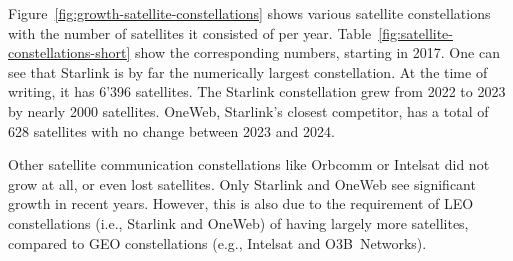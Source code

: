 Figure~\ref{fig:growth-satellite-constellations} shows various satellite
constellations with the number of satellites it consisted of per year.
Table~\ref{fig:satellite-constellations-short} show the corresponding numbers,
starting in 2017. One can see that Starlink is by far the numerically largest
constellation. At the time of writing, it has 6'396 satellites. The Starlink
constellation grew from 2022 to 2023 by nearly 2000 satellites. OneWeb,
Starlink's closest competitor, has a total of 628 satellites with no change
between 2023 and 2024.

Other satellite communication constellations like Orbcomm or Intelsat did not
grow at all, or even lost satellites. Only Starlink and OneWeb see significant
growth in recent years. However, this is also due to the requirement of LEO
constellations (i.e., Starlink and OneWeb) of having largely more satellites,
compared to GEO constellations (e.g., Intelsat and O3B~Networks).
